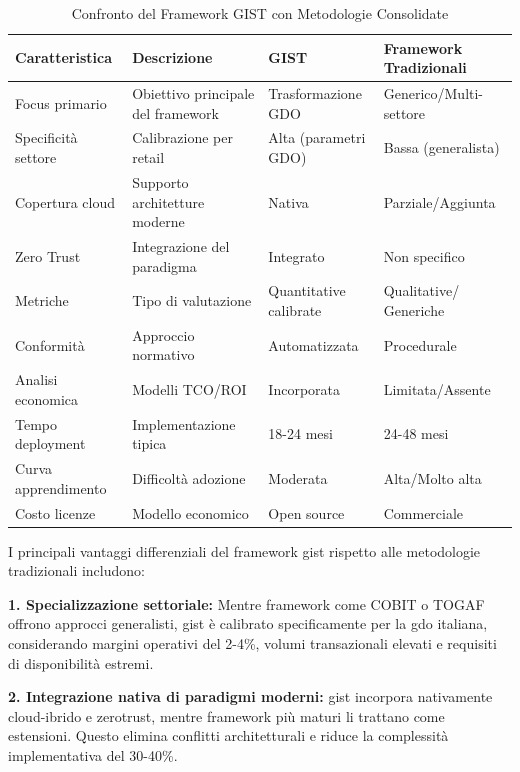 \begin{table}[htbp]
\centering
\caption[Confronto Framework GIST con Metodologie Consolidate]{Confronto del Framework GIST con Metodologie Consolidate}
\label{tab:framework_comparison_revised}
\small
\sffamily
\begin{tabularx}{0.9\textwidth}{X X X X }
\toprule
\rowcolor{gray!10}
\textbf{Caratteristica} & \textbf{Descrizione} & \textbf{GIST} & \textbf{Framework Tradizionali} \\
\midrule
Focus primario & Obiettivo principale del framework & Trasformazione GDO & Generico/Multi-settore \\
\rowcolor{gray!10}
Specificità settore & Calibrazione per retail & Alta (parametri GDO) & Bassa (generalista) \\
Copertura cloud & Supporto architetture moderne & Nativa & Parziale/Aggiunta \\
\rowcolor{gray!10}
Zero Trust & Integrazione del paradigma & Integrato & Non specifico \\
Metriche & Tipo di valutazione & Quantitative calibrate & Qualitative/ Generiche \\
\rowcolor{gray!10}
Conformità & Approccio normativo & Automatizzata & Procedurale \\
Analisi economica & Modelli TCO/ROI & Incorporata & Limitata/Assente \\
\rowcolor{gray!10}
Tempo deployment & Implementazione tipica & 18-24 mesi & 24-48 mesi \\
Curva apprendimento & Difficoltà adozione & Moderata & Alta/Molto alta \\
\rowcolor{gray!10}
Costo licenze & Modello economico & Open source & Commerciale \\
\bottomrule
\end{tabularx}
\end{table}

I principali vantaggi differenziali del framework \gls{gist} rispetto alle metodologie tradizionali includono:

\textbf{1. Specializzazione settoriale:} Mentre framework come COBIT o TOGAF offrono approcci generalisti, \gls{gist} è calibrato specificamente per la \gls{gdo} italiana, considerando margini operativi del 2-4\%, volumi transazionali elevati e requisiti di disponibilità estremi.

\textbf{2. Integrazione nativa di paradigmi moderni:} \gls{gist} incorpora nativamente cloud-ibrido e \gls{zerotrust}, mentre framework più maturi li trattano come estensioni. Questo elimina conflitti architetturali e riduce la complessità implementativa del 30-40\%.

